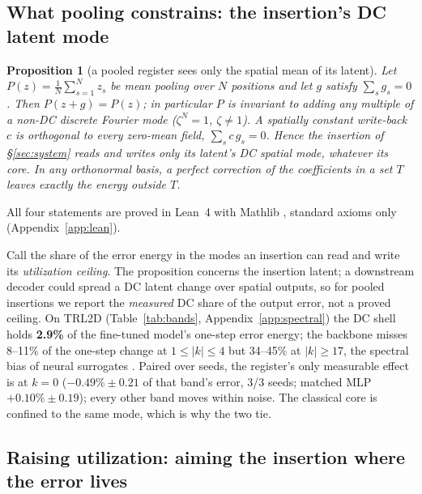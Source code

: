 \documentclass{article}
\newtheorem{proposition}{Proposition}
\begin{document}
\subsection{What pooling constrains: the insertion's DC latent mode}
\label{sec:why}

\begin{proposition}[a pooled register sees only the spatial mean of its latent]\label{prop:pool}
Let $P(z) = \frac1N\sum_{s=1}^{N} z_s$ be mean pooling over $N$ positions and let $g$ satisfy $\sum_s g_s = 0$.
Then $P(z+g) = P(z)$; in particular $P$ is invariant to adding any multiple of a non-DC discrete Fourier mode
($\zeta^N = 1$, $\zeta \ne 1$). A spatially constant write-back $c$ is orthogonal to every zero-mean field,
$\sum_s c\, g_s = 0$. Hence the insertion of \S\ref{sec:system} reads and writes only its latent's DC spatial mode, whatever its core. In any orthonormal basis, a perfect correction of the
coefficients in a set $T$ leaves exactly the energy outside $T$.
\end{proposition}

{\sloppy All four statements are proved in Lean~4 with Mathlib \citep{demoura2021lean4,mathlib2020}, standard axioms only (Appendix~\ref{app:lean}).\par} Call the share of the error energy in the modes
an insertion can read and write its \emph{utilization ceiling}. The proposition concerns the insertion latent; a
downstream decoder could spread a DC latent change over spatial outputs, so for pooled insertions we report the
\emph{measured} DC share of the output error, not a proved ceiling. On TRL2D
(Table~\ref{tab:bands}, Appendix~\ref{app:spectral}) the DC shell holds \textbf{2.9\%} of the fine-tuned model's one-step error energy; the backbone
misses 8--11\% of the one-step change at $1\le|k|\le 4$ but 34--45\% at $|k|\ge 17$, the spectral bias of neural
surrogates \citep{rahaman2019spectral,lippe2023pderefiner}. Paired over seeds, the register's only measurable effect is
at $k{=}0$ ($-0.49\% \pm 0.21$ of that band's error, 3/3 seeds; matched MLP $+0.10\% \pm 0.19$); every other band
moves within noise. The classical core is confined to the same mode, which is why the two tie.

\subsection{Raising utilization: aiming the insertion where the error lives}
\label{sec:move}
\end{document}

